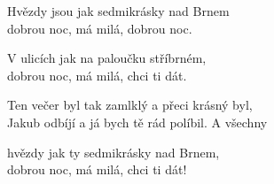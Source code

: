 
\nv{}Hvězdy jsou jak sedmikrásky nad Brnem\\
dobrou noc, má milá, dobrou noc. \nc{}\nc{}
\vspace{15pt}

\nv V ulicích jak na paloučku stříbrném,\\
dobrou noc, má milá, chci ti dát.
\vspace{15pt}

\nv Ten večer byl tak zamlklý a přeci krásný byl,\\
Jakub odbíjí a já bych tě rád políbil. A všechny
\vspace{15pt}

\nv hvězdy jak ty sedmikrásky nad Brnem,\\
dobrou noc, má milá, chci ti dát!
\newpage
